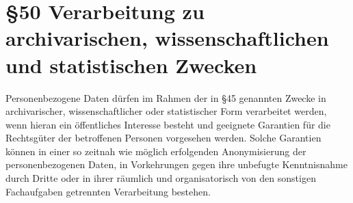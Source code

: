     \section[\S 50 Verarbeitung zu \dots statistischen Zwecken]{\S 50 Verarbeitung zu archivarischen, wissenschaftlichen  und statistischen Zwecken}
    Personenbezogene Daten dürfen im Rahmen der in \S 45 genannten Zwecke in archivarischer, wissenschaftlicher oder statistischer Form verarbeitet werden, wenn hieran ein öffentliches Interesse besteht und geeignete Garantien für die Rechtsgüter der betroffenen Personen vorgesehen werden. Solche Garantien können in einer so zeitnah wie möglich erfolgenden Anonymisierung der personenbezogenen Daten, in Vorkehrungen gegen ihre unbefugte Kenntnisnahme durch Dritte oder in ihrer räumlich und organisatorisch von den sonstigen Fachaufgaben getrennten Verarbeitung bestehen.
